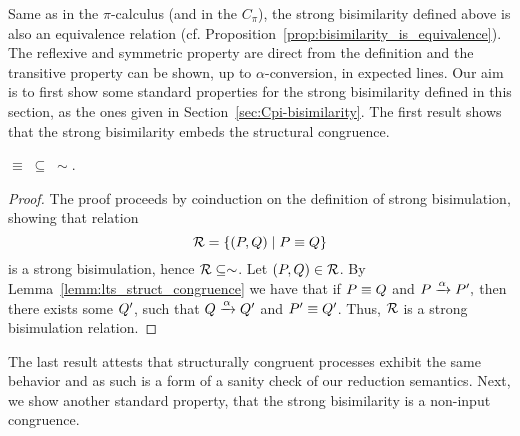 Same as in the $\pi$-calculus (and in the $C_\pi$), the strong bisimilarity defined above is also an equivalence relation (cf. Proposition~\ref{prop:bisimilarity_is_equivalence}). The reflexive and symmetric property are direct from the definition and the transitive property can be shown, up to $\alpha$-conversion, in expected lines. %
%
%
Our aim is to first show some standard properties for the strong bisimilarity defined in this section, as the ones given in Section~\ref{sec:Cpi-bisimilarity}.
The first result shows that the strong bisimilarity embeds the structural congruence.
\begin{proposition}\label{prop:struct.equiv_bis}
$\equiv \; \subseteq\; \sim$.
\end{proposition}
\begin{proof}
The proof proceeds by coinduction on the definition of strong bisimulation, showing that relation 
\[
{\cal R}=\{(P, Q) \;|\; P\equiv Q\}
\]
is a strong bisimulation, hence ${\cal R}\subseteq\sim$.
Let $(P, Q)\in{\cal R}$. By Lemma~\ref{lemm:lts_struct_congruence} we have that if $P\equiv Q$ and $P\xrightarrow{\alpha}P',$ then there exists some $Q'$, such that $Q\xrightarrow{\alpha}Q'$ and $P'\equiv Q'$. Thus, $\cal R$ is a strong bisimulation relation.
\end{proof}

The last result attests that structurally congruent processes exhibit the same behavior and as such is a form of a sanity check of our reduction semantics. %
Next, we show another standard property, that the strong bisimilarity is a non-input congruence.

